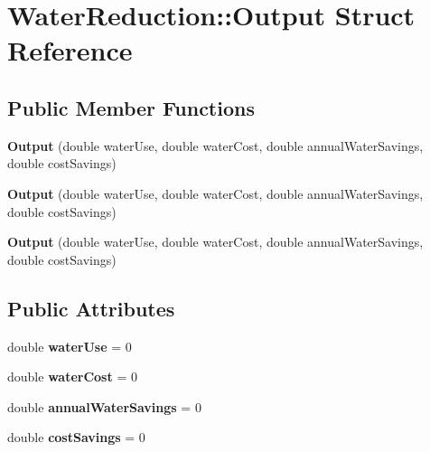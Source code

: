 \hypertarget{struct_water_reduction_1_1_output}{}\section{Water\+Reduction\+:\+:Output Struct Reference}
\label{struct_water_reduction_1_1_output}
\subsection*{Public Member Functions}
\begin{DoxyCompactItemize}
\item 
\mbox{\label{struct_water_reduction_1_1_output_a89d0dfacee695456df93e6d921a46412}} 
{\bfseries Output} (double water\+Use, double water\+Cost, double annual\+Water\+Savings, double cost\+Savings)
\item 
\mbox{\label{struct_water_reduction_1_1_output_a89d0dfacee695456df93e6d921a46412}} 
{\bfseries Output} (double water\+Use, double water\+Cost, double annual\+Water\+Savings, double cost\+Savings)
\item 
\mbox{\label{struct_water_reduction_1_1_output_a89d0dfacee695456df93e6d921a46412}} 
{\bfseries Output} (double water\+Use, double water\+Cost, double annual\+Water\+Savings, double cost\+Savings)
\end{DoxyCompactItemize}
\subsection*{Public Attributes}
\begin{DoxyCompactItemize}
\item 
\mbox{\label{struct_water_reduction_1_1_output_a5965b55662fdb8f64a924203797fb264}} 
double {\bfseries water\+Use} = 0
\item 
\mbox{\label{struct_water_reduction_1_1_output_a59dc779a69ca156317af448717458500}} 
double {\bfseries water\+Cost} = 0
\item 
\mbox{\label{struct_water_reduction_1_1_output_a9da8ae5dbf5f7acdc2932495b5df7f75}} 
double {\bfseries annual\+Water\+Savings} = 0
\item 
\mbox{\label{struct_water_reduction_1_1_output_ad410ccdeb0e41763bcc960b6ea61eebc}} 
double {\bfseries cost\+Savings} = 0
\end{DoxyCompactItemize}


